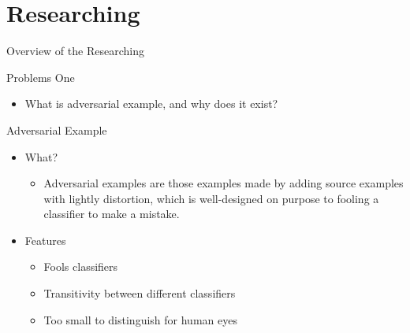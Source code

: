 \documentclass[
 size=12pt,
 paper=smartboard, %
 mode=present, %
 display=slides, %
style=tuliplab,
pauseslide,
fleqn,leqno]{powerdot}
\begin{document}
\section{Researching}

\begin{slide}[toc=,bm=]{Overview of the Researching}
\tableofcontents[content=currentsection,type=0]
\end{slide}

\begin{slide}{Problems One}
  \begin{itemize}
    \item What is adversarial example, and why does it exist?
  \end{itemize}
\end{slide}

\begin{slide}{Adversarial Example}
  \begin{itemize}
    \item What?
    \begin{itemize}
      \item Adversarial examples are those examples made by adding source examples with lightly distortion, which is well-designed on purpose to fooling a classifier to make a mistake.
    \end{itemize}
    \item Features \pause
    \begin{itemize}
      \item Fools classifiers \pause
      \item Transitivity between different classifiers \pause
      \item Too small to distinguish for human eyes \pause
    \end{itemize}
  \end{itemize}
\end{slide}
\end{document}
